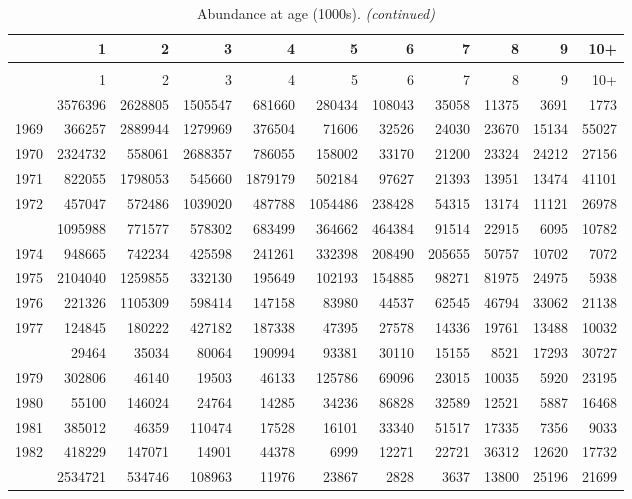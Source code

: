 \documentclass[
]{article}
\begin{document}
\begin{longtable}[t]{lrrrrrrrrrr}
\caption{\label{tab:NAA-table}Abundance at age (1000s).}\\
\toprule
  & 1 & 2 & 3 & 4 & 5 & 6 & 7 & 8 & 9 & 10+\\
\midrule
\endfirsthead
\caption[]{Abundance at age (1000s). \textit{(continued)}}\\
\toprule
  & 1 & 2 & 3 & 4 & 5 & 6 & 7 & 8 & 9 & 10+\\
\midrule
\endhead

\endfoot
\bottomrule
\endlastfoot
1968 & 3576396 & 2628805 & 1505547 & 681660 & 280434 & 108043 & 35058 & 11375 & 3691 & 1773\\
1969 & 366257 & 2889944 & 1279969 & 376504 & 71606 & 32526 & 24030 & 23670 & 15134 & 55027\\
1970 & 2324732 & 558061 & 2688357 & 786055 & 158002 & 33170 & 21200 & 23324 & 24212 & 27156\\
1971 & 822055 & 1798053 & 545660 & 1879179 & 502184 & 97627 & 21393 & 13951 & 13474 & 41101\\
1972 & 457047 & 572486 & 1039020 & 487788 & 1054486 & 238428 & 54315 & 13174 & 11121 & 26978\\
\addlinespace
1973 & 1095988 & 771577 & 578302 & 683499 & 364662 & 464384 & 91514 & 22915 & 6095 & 10782\\
1974 & 948665 & 742234 & 425598 & 241261 & 332398 & 208490 & 205655 & 50757 & 10702 & 7072\\
1975 & 2104040 & 1259855 & 332130 & 195649 & 102193 & 154885 & 98271 & 81975 & 24975 & 5938\\
1976 & 221326 & 1105309 & 598414 & 147158 & 83980 & 44537 & 62545 & 46794 & 33062 & 21138\\
1977 & 124845 & 180222 & 427182 & 187338 & 47395 & 27578 & 14336 & 19761 & 13488 & 10032\\
\addlinespace
1978 & 29464 & 35034 & 80064 & 190994 & 93381 & 30110 & 15155 & 8521 & 17293 & 30727\\
1979 & 302806 & 46140 & 19503 & 46133 & 125786 & 69096 & 23015 & 10035 & 5920 & 23195\\
1980 & 55100 & 146024 & 24764 & 14285 & 34236 & 86828 & 32589 & 12521 & 5887 & 16468\\
1981 & 385012 & 46359 & 110474 & 17528 & 16101 & 33340 & 51517 & 17335 & 7356 & 9033\\
1982 & 418229 & 147071 & 14901 & 44378 & 6999 & 12271 & 22721 & 36312 & 12620 & 17732\\
\addlinespace
1983 & 2534721 & 534746 & 108963 & 11976 & 23867 & 2828 & 3637 & 13800 & 25196 & 21699\\

\end{longtable}
\end{document}
